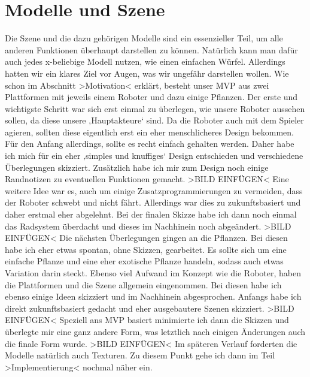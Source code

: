 \section{Modelle und Szene}

Die Szene und die dazu gehörigen Modelle sind ein essenzieller Teil, um alle anderen Funktionen überhaupt darstellen zu können. Natürlich kann man dafür auch jedes x-beliebige Modell nutzen, wie einen einfachen Würfel. Allerdings hatten wir ein klares Ziel vor Augen, was wir ungefähr darstellen wollen. Wie schon im Abschnitt >Motivation< erklärt, besteht unser MVP aus zwei Plattformen mit jeweils einem Roboter und dazu einige Pflanzen.
Der erste und wichtigste Schritt war sich erst einmal zu überlegen, wie unsere Roboter aussehen sollen, da diese unsere ‚Hauptakteure‘ sind. Da die Roboter auch mit dem Spieler agieren, sollten diese eigentlich erst ein eher menschlicheres Design bekommen. Für den Anfang allerdings, sollte es recht einfach gehalten werden. Daher habe ich mich für ein eher ‚simples und knuffiges‘ Design entschieden und verschiedene Überlegungen skizziert. Zusätzlich habe ich mir zum Design noch einige Randnotizen zu eventuellen Funktionen gemacht. >BILD EINFÜGEN< Eine weitere Idee war es, auch um einige Zusatzprogrammierungen zu vermeiden, dass der Roboter schwebt und nicht fährt. Allerdings war dies zu zukunftsbasiert und daher erstmal eher abgelehnt. Bei der finalen Skizze habe ich dann noch einmal das Radsystem überdacht und dieses im Nachhinein noch abgeändert.  >BILD EINFÜGEN< 
Die nächsten Überlegungen gingen an die Pflanzen. Bei diesen habe ich eher etwas spontan, ohne Skizzen, gearbeitet. Es sollte sich um eine einfache Pflanze und eine eher exotische Pflanze handeln, sodass auch etwas Variation darin steckt.
Ebenso viel Aufwand im Konzept wie die Roboter, haben die Plattformen und die Szene allgemein eingenommen. Bei diesen habe ich ebenso einige Ideen skizziert und im Nachhinein abgesprochen. Anfangs habe ich direkt zukunftsbasiert gedacht und eher ausgebautere Szenen skizziert. >BILD EINFÜGEN< Speziell ans MVP basiert minimierte ich dann die Skizzen und überlegte mir eine ganz andere Form, was letztlich nach einigen Änderungen auch die finale Form wurde. >BILD EINFÜGEN<
Im späteren Verlauf forderten die Modelle natürlich auch Texturen. Zu diesem Punkt gehe ich dann im Teil >Implementierung< nochmal näher ein.
